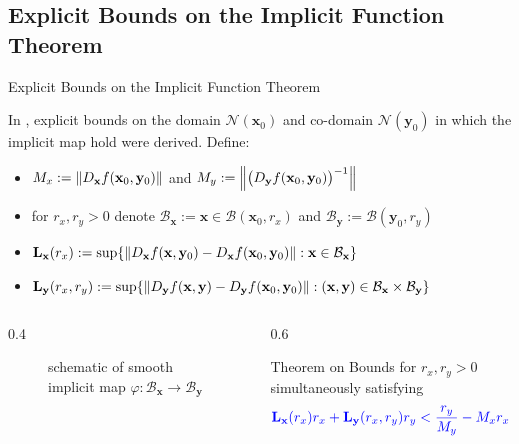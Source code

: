 \documentclass[11pt]{beamer}
\begin{document}
\begin{frame}{\section{Explicit Bounds on the Implicit Function Theorem}Explicit Bounds on the Implicit Function Theorem}
    In \cite[Corollary 3.8]{jindal2023imft}, \alert{explicit bounds on the domain \(\mathcal{N}(\mathbf{x}_0)\) and co-domain \(\mathcal{N}(\mathbf{y}_0)\)} in which the implicit map hold were derived. Define: %
    \begin{itemize}
        \item \(M_x := \norm{D_{\mathbf{x}}f(\mathbf{x}_0,\mathbf{y}_0)}\) and \(M_y := \norm{\big(D_{\mathbf{y}}f(\mathbf{x}_0,\mathbf{y}_0)\big)^{-1}}\)
        \item for \(r_x,r_y>0\) denote \(\mathcal{B}_\mathbf{x}:=\mathbf{x}\in\mathcal{B}(\mathbf{x}_0,r_x)\) and \(\mathcal{B}_\mathbf{y}:=\mathcal{B}(\mathbf{y}_0,r_y)\)
        \item \(\mathbf{L}_\mathbf{x}(r_x) := \sup\{\norm{D_\mathbf{x}f(\mathbf{x},\mathbf{y}_0)-D_\mathbf{x}f(\mathbf{x}_0,\mathbf{y}_0)}: \mathbf{x}\in\mathcal{B}_\mathbf{x}\}\)
        \item \(\mathbf{L}_\mathbf{y}(r_x,r_y) := \sup\{\norm{D_\mathbf{y}f(\mathbf{x},\mathbf{y})-D_\mathbf{y}f(\mathbf{x}_0,\mathbf{y}_0)}: (\mathbf{x},\mathbf{y})\in\mathcal{B}_\mathbf{x}\times\mathcal{B}_\mathbf{y}\}\)
    \end{itemize}
    \label{imftbounds}
    \begin{columns}
        \begin{column}{0.4\textwidth}
            \begin{figure}[ht!]
                \centering
                
                \caption{schematic of smooth implicit map \(\varphi:\mathcal{B}_{\mathbf{x}}\to\mathcal{B}_{\mathbf{y}}\)}
            \end{figure}
        \end{column}
        \begin{column}{0.6\textwidth}
            \begin{block}{Theorem on Bounds}
                for \(r_x,r_y>0\) simultaneously satisfying
                \vspace{-4mm}\[\color{blue}{\begin{aligned}
                    \mathbf{L}_\mathbf{x}(r_x)r_x+\mathbf{L}_\mathbf{y}(r_x,r_y)r_y & < \frac{r_y}{M_y}-M_xr_x\\

\end{aligned}}\]
\end{block}
\end{column}
\end{columns}
\end{frame}
\end{document}
